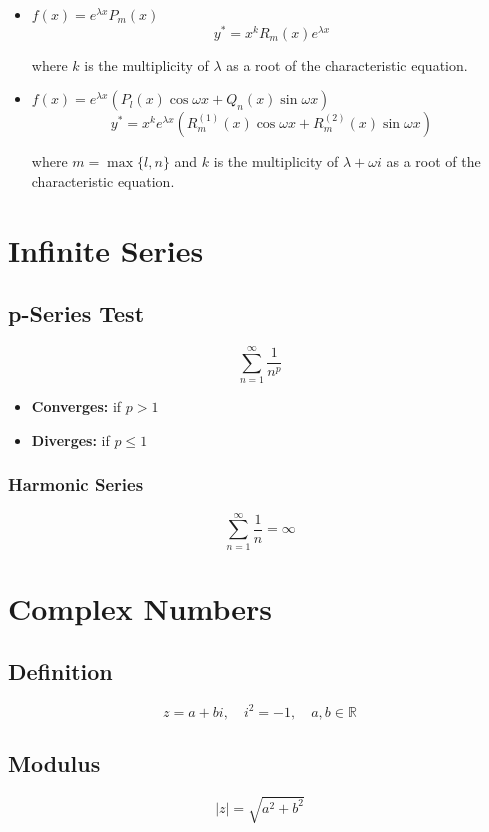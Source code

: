 \documentclass{article}
\begin{document}
\begin{itemize}
    \item $f(x) = e^{\lambda x} P_m(x)$
    \[
        y^* = x^k R_m(x) e^{\lambda x}
    \]

    where $k$ is the multiplicity of $\lambda$ as a root of the characteristic equation.

    \item $f(x) = e^{\lambda x}(P_l(x) \cos \omega x + Q_n(x) \sin \omega x)$
    \[
        y^* = x^k e^{\lambda x}(R_m^{(1)}(x) \cos \omega x + R_m^{(2)}(x) \sin \omega x)
    \]

    where $m = \max\{l, n\}$ and $k$ is the multiplicity of $\lambda + \omega i$ as a root of the characteristic equation.
\end{itemize}


\newpage
\section{Infinite Series}

\subsection{p-Series Test}

\[
    \sum_{n=1}^{\infty} \frac{1}{n^p}
\]
\begin{itemize}
    \item \textbf{Converges:} if $p > 1$
    \item \textbf{Diverges:} if $p \le 1$
\end{itemize}

\subsubsection{Harmonic Series}
\[
    \sum_{n=1}^{\infty} \frac{1}{n} = \infty
\]


\newpage
\section{Complex Numbers}

\subsection{Definition}
\[
    z = a + bi, \quad i^2 = -1, \quad a, b \in \mathbb{R}
\]

\subsection{Modulus}
\[
    |z| = \sqrt{a^2 + b^2}
\]
\end{document}
